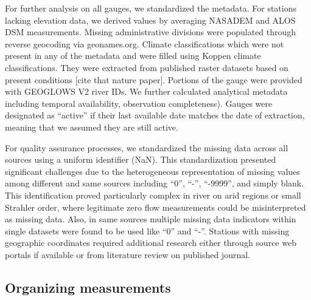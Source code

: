 For further analysis on all gauges, we standardized the metadata. For stations lacking elevation data, we derived values by averaging NASADEM and ALOS DSM measurements. Missing administrative divisions were populated through reverse geocoding via geonames.org. Climate classifications which were not present in any of the metadata and were filled using Koppen climate classifications. They were extracted from published raster datasets based on present conditions [cite that nature paper]. Portions of the gauge were provided with GEOGLOWS V2 river IDs. We further calculated analytical metadata including temporal availability, observation completeness). Gauges were designated as ``active'' if their last available date matches the date of extraction, meaning that we assumed they are still active.

For quality assurance processes, we standardized the missing data across all sources using a uniform identifier (NaN). This standardization presented significant challenges due to the heterogeneous representation of missing values among different and same sources including ``0'', \mbox{``-''}, \mbox{``-9999''}, and simply blank. This identification proved particularly complex in river on arid regions or small Strahler order, where legitimate zero flow measurements could be misinterpreted as missing data. Also, in same sources multiple missing data indicators within single datasets were found to be used like ``0'' and \mbox{``-''}. Stations with missing geographic coordinates required additional research either through source web portals if available or from literature review on published journal.

\subsection{Organizing measurements}


